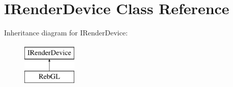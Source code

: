 \hypertarget{class_i_render_device}{}\section{I\+Render\+Device Class Reference}
\label{class_i_render_device}
Inheritance diagram for I\+Render\+Device\+:\begin{figure}[H]
\begin{center}
\leavevmode
\includegraphics[height=2.000000cm]{class_i_render_device}
\end{center}
\end{figure}
